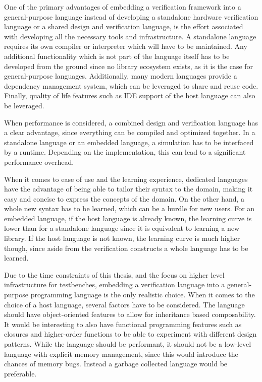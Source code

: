 \documentclass[11pt,a4paper]{report}
\begin{document}
One of the primary advantages of embedding a verification framework into a general-purpose language instead of
developing a standalone hardware verification language or a shared design and verification language, is the effort
associated with developing all the necessary tools and infrastructure. A standalone language requires its own
compiler or interpreter which will have to be maintained. Any additional functionality which is not part of the
language itself has to be developed from the ground since no library ecosystem exists, as it is the case for
general-purpose languages. Additionally, many modern languages provide a dependency management system, which can be
leveraged to share and reuse code. Finally, quality of life features such as IDE support of the host language can
also be leveraged.

When performance is considered, a combined design and verification language has a clear advantage, since everything
can be compiled and optimized together. In a standalone language or an embedded language, a simulation has to be
interfaced by a runtime. Depending on the implementation, this can lead to a significant performance overhead.

When it comes to ease of use and the learning experience, dedicated languages have the advantage of being able to
tailor their syntax to the domain, making it easy and concise to express the concepts of the domain. On the other
hand, a whole new syntax has to be learned, which can be a hurdle for new users. For an embedded language, if the
host language is already known, the learning curve is lower than for a standalone language since it is equivalent to
learning a new library. If the host language is not known, the learning curve is much higher though, since aside from
the verification constructs a whole language has to be learned.

Due to the time constraints of this thesis, and the focus on higher level infrastructure for testbenches, embedding a
verification language into a general-purpose programming language is the only realistic choice. When it comes to the
choice of a host language, several factors have to be considered. The language should have object-oriented features
to allow for inheritance based composability. It would be interesting to also have functional programming features
such as closures and higher-order functions to be able to experiment with different design patterns. While the
language should be performant, it should not be a low-level language with explicit memory management, since this
would introduce the chances of memory bugs. Instead a garbage collected language would be preferable.
\end{document}
